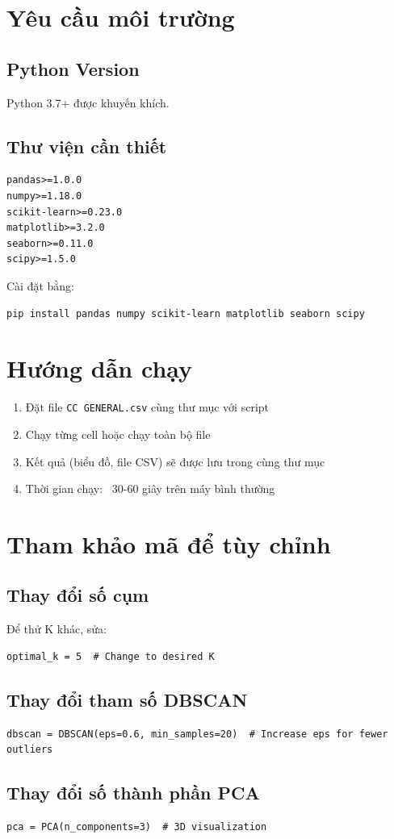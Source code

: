 \section{Yêu cầu môi trường}

\subsection{Python Version}
Python 3.7+ được khuyến khích.

\subsection{Thư viện cần thiết}

\begin{lstlisting}
pandas>=1.0.0
numpy>=1.18.0
scikit-learn>=0.23.0
matplotlib>=3.2.0
seaborn>=0.11.0
scipy>=1.5.0
\end{lstlisting}

Cài đặt bằng:
\begin{lstlisting}
pip install pandas numpy scikit-learn matplotlib seaborn scipy
\end{lstlisting}

\section{Hướng dẫn chạy}

\begin{enumerate}
    \item Đặt file \texttt{CC GENERAL.csv} cùng thư mục với script
    \item Chạy từng cell hoặc chạy toàn bộ file
    \item Kết quả (biểu đồ, file CSV) sẽ được lưu trong cùng thư mục
    \item Thời gian chạy: ~30-60 giây trên máy bình thường
\end{enumerate}

\section{Tham khảo mã để tùy chỉnh}

\subsection{Thay đổi số cụm}

Để thử K khác, sửa:
\begin{lstlisting}
optimal_k = 5  # Change to desired K
\end{lstlisting}

\subsection{Thay đổi tham số DBSCAN}

\begin{lstlisting}
dbscan = DBSCAN(eps=0.6, min_samples=20)  # Increase eps for fewer outliers
\end{lstlisting}

\subsection{Thay đổi số thành phần PCA}

\begin{lstlisting}
pca = PCA(n_components=3)  # 3D visualization
\end{lstlisting}
